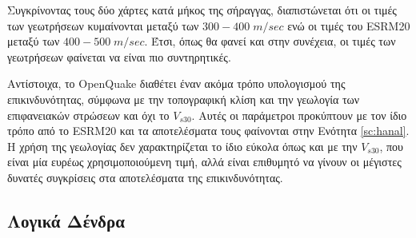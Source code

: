 Συγκρίνοντας τους δύο χάρτες κατά μήκος της σήραγγας, διαπιστώνεται ότι οι τιμές των γεωτρήσεων κυμαίνονται μεταξύ των $300-400\;m/sec$ ενώ οι τιμές του ESRM20 μεταξύ των $400-500\;m/sec$. Έτσι, όπως θα φανεί και στην συνέχεια, οι τιμές των γεωτρήσεων φαίνεται να είναι πιο συντηρητικές.

Αντίστοιχα, το OpenQuake διαθέτει έναν ακόμα τρόπο υπολογισμού της επικινδυνότητας, σύμφωνα με την τοπογραφική κλίση και την γεωλογία των επιφανειακών στρώσεων και όχι το $V_{s30}$. Αυτές οι παράμετροι προκύπτουν με τον ίδιο τρόπο από το ESRM20 και τα αποτελέσματα τους φαίνονται στην Ενότητα \ref{sc:hanal}. Η χρήση της γεωλογίας δεν χαρακτηρίζεται το ίδιο εύκολα όπως και με την $V_{s30}$, που είναι μία ευρέως χρησιμοποιούμενη τιμή, αλλά είναι επιθυμητό να γίνουν οι μέγιστες δυνατές συγκρίσεις στα αποτελέσματα της επικινδυνότητας.

\subsection{Λογικά Δένδρα}
\label{sbs:tree}

